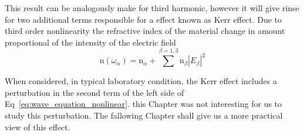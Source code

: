 This result can be analogously make for third harmonic, however it will give rinse for two additional terms responsible for a effect known as Kerr effect\needcit. Due to third order nonlinearity the refractive index of the material change in amount proportional of the intensity of the electric field
\begin{equation}
    \text{n}(\omega_\alpha) = \text{n}_\alpha + \sum^{\beta=1,3} \text{n}_\beta |E_\beta|^2
    \label{eq:kerr_effect_free_wave}
\end{equation}

When considered, in typical laboratory condition, the Kerr effect includes a perturbation in the second term of the left side of Eq~\ref{eq:wave_equation_nonlinear}. this Chapter was not interesting for us to study this perturbation. The fallowing Chapter shall give us a more practical view of this effect.